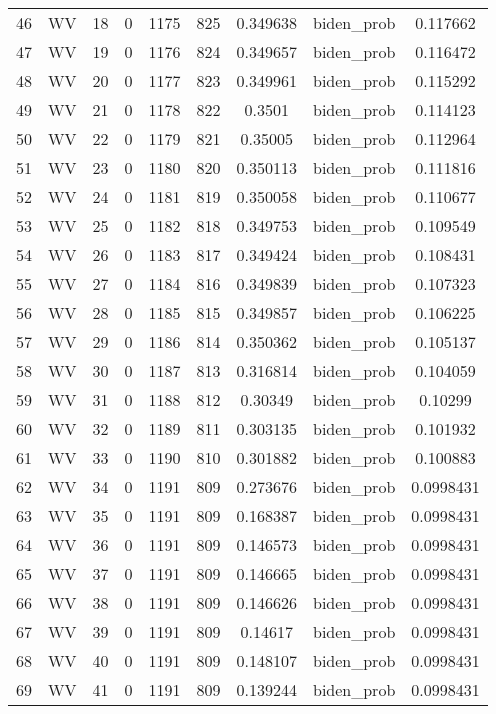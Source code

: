 \documentclass[12pt,a4paper]{article}
\begin{document}
\begin{tabular}{r|cccccccc}
	46 & WV & 18 & 0 & 1175 & 825 & 0.349638 & biden\_prob & 0.117662 \\
	47 & WV & 19 & 0 & 1176 & 824 & 0.349657 & biden\_prob & 0.116472 \\
	48 & WV & 20 & 0 & 1177 & 823 & 0.349961 & biden\_prob & 0.115292 \\
	49 & WV & 21 & 0 & 1178 & 822 & 0.3501 & biden\_prob & 0.114123 \\
	50 & WV & 22 & 0 & 1179 & 821 & 0.35005 & biden\_prob & 0.112964 \\
	51 & WV & 23 & 0 & 1180 & 820 & 0.350113 & biden\_prob & 0.111816 \\
	52 & WV & 24 & 0 & 1181 & 819 & 0.350058 & biden\_prob & 0.110677 \\
	53 & WV & 25 & 0 & 1182 & 818 & 0.349753 & biden\_prob & 0.109549 \\
	54 & WV & 26 & 0 & 1183 & 817 & 0.349424 & biden\_prob & 0.108431 \\
	55 & WV & 27 & 0 & 1184 & 816 & 0.349839 & biden\_prob & 0.107323 \\
	56 & WV & 28 & 0 & 1185 & 815 & 0.349857 & biden\_prob & 0.106225 \\
	57 & WV & 29 & 0 & 1186 & 814 & 0.350362 & biden\_prob & 0.105137 \\
	58 & WV & 30 & 0 & 1187 & 813 & 0.316814 & biden\_prob & 0.104059 \\
	59 & WV & 31 & 0 & 1188 & 812 & 0.30349 & biden\_prob & 0.10299 \\
	60 & WV & 32 & 0 & 1189 & 811 & 0.303135 & biden\_prob & 0.101932 \\
	61 & WV & 33 & 0 & 1190 & 810 & 0.301882 & biden\_prob & 0.100883 \\
	62 & WV & 34 & 0 & 1191 & 809 & 0.273676 & biden\_prob & 0.0998431 \\
	63 & WV & 35 & 0 & 1191 & 809 & 0.168387 & biden\_prob & 0.0998431 \\
	64 & WV & 36 & 0 & 1191 & 809 & 0.146573 & biden\_prob & 0.0998431 \\
	65 & WV & 37 & 0 & 1191 & 809 & 0.146665 & biden\_prob & 0.0998431 \\
	66 & WV & 38 & 0 & 1191 & 809 & 0.146626 & biden\_prob & 0.0998431 \\
	67 & WV & 39 & 0 & 1191 & 809 & 0.14617 & biden\_prob & 0.0998431 \\
	68 & WV & 40 & 0 & 1191 & 809 & 0.148107 & biden\_prob & 0.0998431 \\
	69 & WV & 41 & 0 & 1191 & 809 & 0.139244 & biden\_prob & 0.0998431 \\

\end{tabular}
\end{document}
